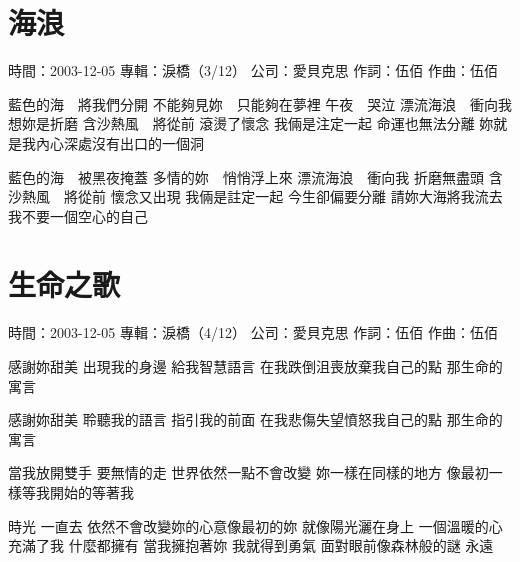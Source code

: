 \documentclass[UTF8,a4paper,oneside,twocolumn,12pt]{ctexbook}
\newcommand{\infopair}[2]{\textbullet #1：#2}
\newcommand{\zc}[1][伍佰]{\infopair{作詞}{#1}}
\newcommand{\zq}[1][伍佰]{\infopair{作曲}{#1}}
\newcommand{\zj}[1]{\infopair{專輯}{#1}}
\newcommand{\sj}[1]{\infopair{時間}{#1}}
\newcommand{\gs}[1]{\infopair{公司}{#1}}
\newenvironment{info}{\begin{flushleft}\kaishu
	}
	{\end{flushleft}\normalsize\yahei\par}
\newenvironment{lyric}{
	}
{}
\begin{document}
\section{海浪}
\begin{info}
	\sj{2003-12-05}
	\zj{淚橋（3/12）}
	\gs{愛貝克思}
	\zc
	\zq
\end{info}
\begin{lyric}
	藍色的海　將我們分開
	不能夠見妳　只能夠在夢裡
	午夜　哭泣
	漂流海浪　衝向我
	想妳是折磨
	含沙熱風　將從前
	滾燙了懷念
	我倆是注定一起
	命運也無法分離
	妳就是我內心深處沒有出口的一個洞

	藍色的海　被黑夜掩蓋
	多情的妳　悄悄浮上來
	漂流海浪　衝向我
	折磨無盡頭
	含沙熱風　將從前
	懷念又出現
	我倆是註定一起
	今生卻偏要分離
	請妳大海將我流去
	我不要一個空心的自己
\end{lyric}

\section{生命之歌}
\begin{info}
	\sj{2003-12-05}
	\zj{淚橋（4/12）}
	\gs{愛貝克思}
	\zc
	\zq
\end{info}
\begin{lyric}
	感謝妳甜美 出現我的身邊 給我智慧語言
	在我跌倒沮喪放棄我自己的點 那生命的寓言

	感謝妳甜美 聆聽我的語言 指引我的前面
	在我悲傷失望憤怒我自己的點 那生命的寓言

	當我放開雙手 要無情的走 世界依然一點不會改變
	妳一樣在同樣的地方 像最初一樣等我開始的等著我

	時光 一直去 依然不會改變妳的心意像最初的妳
	就像陽光灑在身上 一個溫暖的心充滿了我 什麼都擁有
	當我擁抱著妳 我就得到勇氣 面對眼前像森林般的謎 永遠
\end{lyric}
\end{document}
